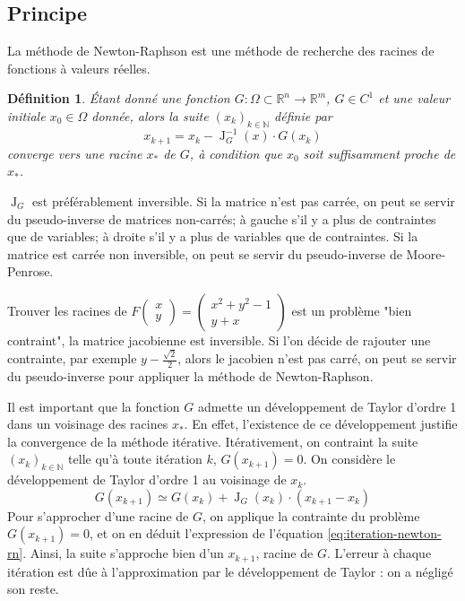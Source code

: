 \documentclass[3p, twocolumn]{elsarticle}
\DeclareMathOperator{\Jacobian}{J}
\newtheorem{definition}{Définition}[section]
\begin{document}
\subsection{Principe}
La méthode de Newton-Raphson est une méthode de recherche des racines de fonctions à valeurs réelles.
\begin{definition}
    Étant donné une fonction $G: \Omega\subset\mathbb{R}^n\longrightarrow \mathbb{R}^m$, $G\in C^1$ et une valeur initiale $x_0\in \Omega$ donnée, alors la suite $(x_k)_{k\in \mathbb{N}}$ définie par
    \begin{equation}
        x_{k+1} = x_k - \Jacobian^{-1}_G(x)\cdot G(x_k)
        \label{eq:iteration-newton-rn}
    \end{equation}
    converge vers une racine $x_*$ de $G$, à condition que $x_0$ soit suffisamment proche de $x_*$.
\end{definition}
\begin{rmk}
    $\Jacobian_G$ est préférablement inversible. Si la matrice n'est pas carrée, on peut se servir du pseudo-inverse de matrices non-carrés; à gauche s'il y a plus de contraintes que de variables; à droite s'il y a plus de variables que de contraintes. Si la matrice est carrée non inversible, on peut se servir du pseudo-inverse de Moore-Penrose. 
    \begin{exemple}
        Trouver les racines de $F
        \begin{pmatrix}
            x\\y
        \end{pmatrix}
        =
        \begin{pmatrix}
            x^2+y^2-1\\
            y+x
        \end{pmatrix}$ est un problème "bien contraint", la matrice jacobienne est inversible. Si l'on décide de rajouter une contrainte, par exemple $y-\frac{\sqrt2}{2}$, alors le jacobien n'est pas carré, on peut se servir du pseudo-inverse pour appliquer la méthode de Newton-Raphson.
    \end{exemple}
\end{rmk}
\begin{rmk}
    Il est important que la fonction $G$ admette un développement de Taylor d'ordre 1 dans un voisinage des racines $x_*$. En effet, l'existence de ce développement justifie la convergence de la méthode itérative. Itérativement, on contraint la suite $(x_k)_{k\in \mathbb{N}}$ telle qu'à toute itération $k$, $G(x_{k+1})=0$. On considère le développement de Taylor d'ordre 1 au voisinage de $x_{k}$.
    \begin{equation*}
        G(x_{k+1})\simeq G(x_k)+\Jacobian_G(x_k)\cdot(x_{k+1}-x_k)
    \end{equation*}
    Pour s'approcher d'une racine de $G$, on applique la contrainte du problème $G(x_{k+1})=0$, et on en déduit l'expression de l'équation \ref{eq:iteration-newton-rn}. Ainsi, la suite s'approche bien d'un $x_{k+1}$, racine de $G$. L'erreur à chaque itération est dûe à l'approximation par le développement de Taylor : on a négligé son reste.
\end{rmk}
\end{document}
